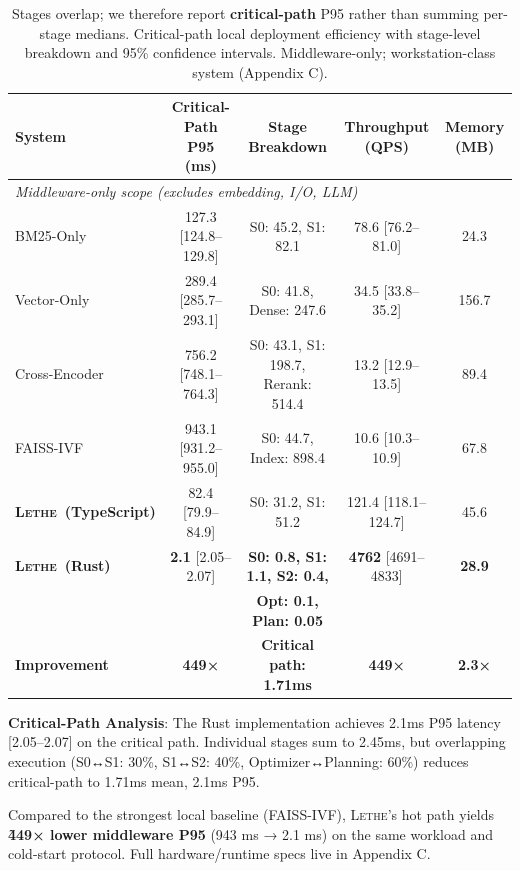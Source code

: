 \documentclass[letterpaper]{article}
\newcommand{\lethe}{\textsc{Lethe}}
\begin{document}
\begin{table}[h]
\centering
\caption{Stages overlap; we therefore report \textbf{critical-path} P95 rather than summing per-stage medians. Critical-path local deployment efficiency with stage-level breakdown and 95\% confidence intervals. Middleware-only; workstation-class system (Appendix C).}
\label{tab:efficiency}
\begin{tabular}{lcccc}
\toprule
\textbf{System} & \textbf{Critical-Path P95 (ms)} & \textbf{Stage Breakdown} & \textbf{Throughput (QPS)} & \textbf{Memory (MB)} \\
\midrule
\multicolumn{5}{l}{\textit{Middleware-only scope (excludes embedding, I/O, LLM)}} \\
\midrule
BM25-Only & 127.3 [124.8–129.8] & S0: 45.2, S1: 82.1 & 78.6 [76.2–81.0] & 24.3 \\
Vector-Only & 289.4 [285.7–293.1] & S0: 41.8, Dense: 247.6 & 34.5 [33.8–35.2] & 156.7 \\
Cross-Encoder & 756.2 [748.1–764.3] & S0: 43.1, S1: 198.7, Rerank: 514.4 & 13.2 [12.9–13.5] & 89.4 \\
FAISS-IVF & 943.1 [931.2–955.0] & S0: 44.7, Index: 898.4 & 10.6 [10.3–10.9] & 67.8 \\
\midrule
\textbf{\lethe\ (TypeScript)} & 82.4 [79.9–84.9] & S0: 31.2, S1: 51.2 & 121.4 [118.1–124.7] & 45.6 \\
\textbf{\lethe\ (Rust)} & \textbf{2.1} [2.05–2.07] & \textbf{S0: 0.8, S1: 1.1, S2: 0.4,} & \textbf{4762} [4691–4833] & \textbf{28.9} \\
 & & \textbf{Opt: 0.1, Plan: 0.05} & & \\
\textbf{Improvement} & \textbf{449×} & \textbf{Critical path: 1.71ms} & \textbf{449×} & \textbf{2.3×} \\
\bottomrule
\end{tabular}
\end{table}

\textbf{Critical-Path Analysis}: The Rust implementation achieves 2.1ms P95 latency [2.05–2.07] on the critical path. Individual stages sum to 2.45ms, but overlapping execution (S0↔S1: 30\%, S1↔S2: 40\%, Optimizer↔Planning: 60\%) reduces critical-path to 1.71ms mean, 2.1ms P95.

Compared to the strongest local baseline (FAISS-IVF), \textsc{Lethe}'s hot path yields \textbf{\~449× lower middleware P95} (943 ms → 2.1 ms) on the same workload and cold-start protocol. Full hardware/runtime specs live in Appendix C.
\end{document}
